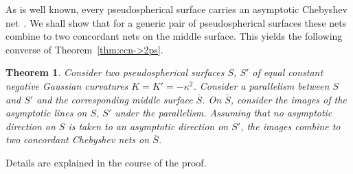 \documentclass[pdftex]{sigma}
\def\k{\kappa}
\newtheorem{Theorem}{Theorem}[section]
\numberwithin{equation}{section}
\begin{document}
As is well known, every pseudospherical surface carries an
asymptotic Chebyshev net~\cite{UD-1870}.
We shall show that for a generic pair of pseudospherical surfaces
these nets combine to two concordant nets on the middle surface.
This yields the following converse of Theorem~\ref{thm:ccn->2ps}.

\begin{Theorem}\label{thm:2ps->ccn}
Consider two pseudospherical surfaces $S$, $S'$
of equal constant negative Gaussian curvatures $K = K' = -\k^2$.
Consider a parallelism between $S$ and $S'$ and the corresponding middle surface $\bar S$.
On $\bar S$, consider the images of the asymptotic lines on $S$, $S'$ under the parallelism.
Assuming that no asymptotic direction on $S$ is taken to an asymptotic direction on $S'$,
the images combine to two concordant Chebyshev nets on $\bar S$.
\end{Theorem}

Details are explained in the course of the proof.
\end{document}
